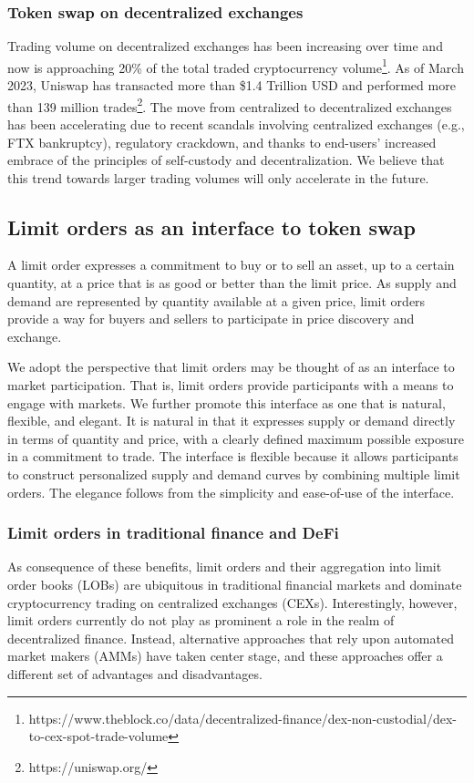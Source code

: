 \documentclass[11pt, reqno]{amsart}
\theoremstyle{definition}
\theoremstyle{remark}
\begin{document}
\subsubsection{Token swap on decentralized exchanges}
Trading volume on decentralized exchanges has been increasing over time and now
is approaching 20\% of the total traded cryptocurrency
volume\footnote{https://www.theblock.co/data/decentralized-finance/dex-non-custodial/dex-to-cex-spot-trade-volume}.
As of March 2023, Uniswap has transacted more than \$1.4 Trillion USD and
performed more than 139 million trades\footnote{https://uniswap.org/}.
The move from centralized to decentralized exchanges has been accelerating due
to recent scandals involving centralized exchanges (e.g., FTX bankruptcy),
regulatory crackdown, and thanks to end-users' increased embrace of the
principles of self-custody and decentralization.
We believe that this trend towards larger trading volumes will only accelerate
in the future.

\subsection{Limit orders as an interface to token swap}
A limit order expresses a commitment to buy or to sell an asset, up to
a certain quantity, at a price that is as good or better than the limit price.
As supply and demand are represented by quantity available at a given price,
limit orders provide a way for buyers and sellers to participate in price
discovery and exchange.

We adopt the perspective that limit orders may be thought of as an interface
to market participation. That is, limit orders provide participants with a
means to engage with markets. We further promote this interface as one that
is natural, flexible, and elegant. It is natural in that it expresses
supply or demand directly in terms of quantity and price, with a clearly
defined maximum possible exposure in a commitment to trade. The interface is
flexible because it allows participants to construct personalized supply and
demand curves by combining multiple limit orders. The elegance follows from the
simplicity and ease-of-use of the interface.

\subsubsection{Limit orders in traditional finance and DeFi}
As consequence of these benefits, limit orders and their aggregation into
limit order books (LOBs) are ubiquitous in traditional financial markets
and dominate cryptocurrency trading on centralized exchanges (CEXs).
Interestingly, however, limit orders currently do not play as prominent a role
in the realm of decentralized finance. Instead, alternative approaches that
rely upon automated market makers (AMMs) have taken center stage, and these
approaches offer a different set of advantages and disadvantages.
\end{document}
